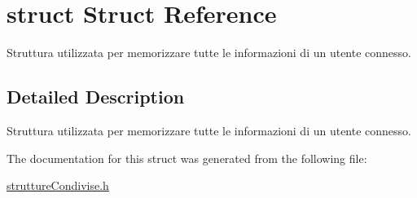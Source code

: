 \hypertarget{structstruct}{}\section{struct Struct Reference}
\label{structstruct}


Struttura utilizzata per memorizzare tutte le informazioni di un utente connesso.  




\subsection{Detailed Description}
Struttura utilizzata per memorizzare tutte le informazioni di un utente connesso. 

The documentation for this struct was generated from the following file\+:\begin{DoxyCompactItemize}
\item 
\hyperlink{struttureCondivise_8h}{strutture\+Condivise.\+h}\end{DoxyCompactItemize}
